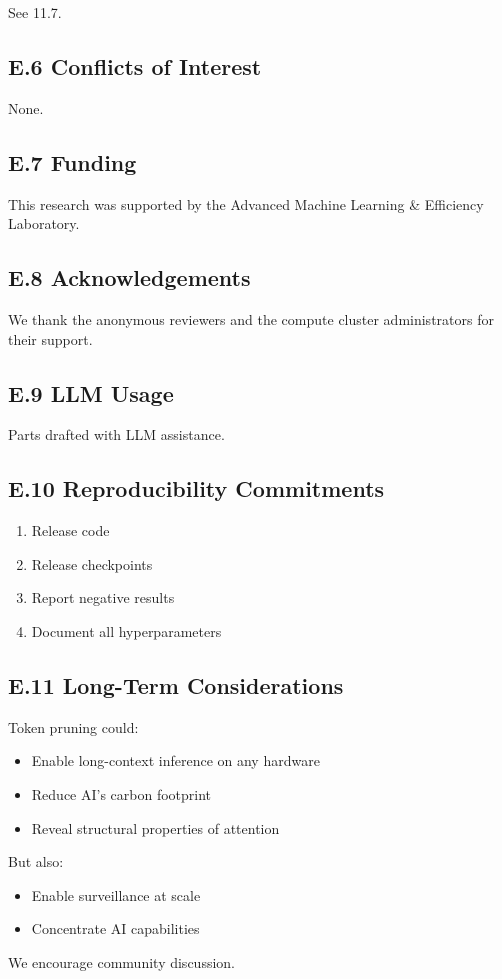 See  11.7.

\subsection{E.6 Conflicts of Interest}

None.

\subsection{E.7 Funding}

This research was supported by the Advanced Machine Learning \& Efficiency Laboratory.

\subsection{E.8 Acknowledgements}

We thank the anonymous reviewers and the compute cluster administrators for their support.

\subsection{E.9 LLM Usage}

Parts drafted with LLM assistance.

\subsection{E.10 Reproducibility Commitments}

\begin{enumerate}
\item Release code
\item Release checkpoints
\item Report negative results
\item Document all hyperparameters

\end{enumerate}
\subsection{E.11 Long-Term Considerations}

Token pruning could:

\begin{itemize}
\item Enable long-context inference on any hardware
\item Reduce AI's carbon footprint
\item Reveal structural properties of attention

\end{itemize}
But also:

\begin{itemize}
\item Enable surveillance at scale
\item Concentrate AI capabilities

\end{itemize}
We encourage community discussion.

